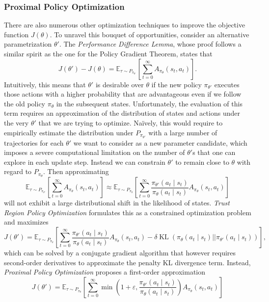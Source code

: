 \documentclass[a4paper, 11pt]{article}
\begin{document}
	\subsubsection{Proximal Policy Optimization}
	There are also numerous other optimization techniques to improve the objective function $J(\theta)$. To unravel this bouquet of opportunities, consider an alternative parametrization $\theta'$. The \textit{Performance Difference Lemma}, whose proof follows a similar spirit as the one for the Policy Gradient Theorem, states that 
	\[J(\theta')-J(\theta)=\mathbb{E}_{\tau\sim P_{\pi_{\theta'}}}\left[\sum_{t=0}^{\infty} A_{\pi_{\theta}}(s_t,a_t) \right].\]
	Intuitively, this means that $\theta'$ is desirable over $\theta$ if the new policy $\pi_{\theta'}$ executes those actions with a higher probability that are advantageous even if we follow the old policy $\pi_{\theta}$ in the subsequent states. Unfortunately, the evaluation of this term requires an approximation of the distribution of states and actions under the very $\theta'$ that we are trying to optimize. Na\"ively, this would require to empirically estimate the distribution under $P_{\pi_{\theta'}}$ with a large number of trajectories for each $\theta'$ we want to consider as a new parameter candidate, which imposes a severe computational limitation on the number of $\theta'$s that one can explore in each update step.
	Instead we can constrain $\theta'$ to remain close to $\theta$ with regard to $P_{\pi_{\theta}}$. Then approximating 
	\[\mathbb{E}_{\tau\sim P_{\pi_{\theta'}}}\left[\sum_{t=0}^{\infty} A_{\pi_{\theta}}(s_t,a_t) \right]\approx\mathbb{E}_{\tau\sim P_{\pi_{\theta}}}\left[\sum_{t=0}^{\infty} \frac{\pi_{\theta'}(a_t\mid s_t)}{\pi_{\theta}(a_t\mid s_t)}A_{\pi_{\theta}}(s_t,a_t) \right]\]
	will not exhibit a large distributional shift in the likelihood of states. \textit{Trust Region Policy Optimization} formulates this as a constrained optimization problem and maximizes
	\[J(\theta')=\mathbb{E}_{\tau\sim P_{\pi_{\theta}}}\left[\sum_{t=0}^{\infty} \frac{\pi_{\theta'}(a_t\mid s_t)}{\pi_{\theta}(a_t\mid s_t)}A_{\pi_{\theta}}(s_t,a_t) - \delta \operatorname{KL}\left(\pi_{\theta}(a_t\mid s_t)||\pi_{\theta'}(a_t\mid s_t)\right) \right],\]
	which can be solved by a conjugate gradient algorithm that however requires second-order derivatives to approximate the penalty KL divergence term. Instead, \textit{Proximal Policy Optimization} proposes a first-order approximation 
	\[J(\theta')=\mathbb{E}_{\tau\sim P_{\pi_{\theta}}}\left[\sum_{t=0}^{\infty} \min\left(1+\varepsilon,\frac{\pi_{\theta'}(a_t\mid s_t)}{\pi_{\theta}(a_t\mid s_t)}\right)A_{\pi_{\theta}}(s_t,a_t)\right]\]
\end{document}
